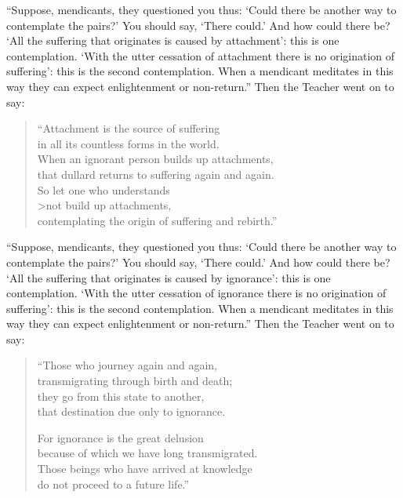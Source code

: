 \documentclass[12pt,openany]{book}%
\begin{document}
“Suppose, mendicants, they questioned you thus: ‘Could there be another way to contemplate the pairs?’ You should say, ‘There could.’ And how could there be? ‘All the suffering that originates is caused by attachment’: this is one contemplation. ‘With the utter cessation of attachment there is no origination of suffering’: this is the second contemplation. When a mendicant meditates in this way they can expect enlightenment or non-return.” Then the Teacher went on to say: 

\begin{verse}%
“Attachment is the source of suffering \\
in all its countless forms in the world. \\
When an ignorant person builds up attachments, \\
that dullard returns to suffering again and again. \\
So let one who understands \\>not build up attachments, \\
contemplating the origin of suffering and rebirth.” 

%
\end{verse}

“Suppose, mendicants, they questioned you thus: ‘Could there be another way to contemplate the pairs?’ You should say, ‘There could.’ And how could there be? ‘All the suffering that originates is caused by ignorance’: this is one contemplation. ‘With the utter cessation of ignorance there is no origination of suffering’: this is the second contemplation. When a mendicant meditates in this way they can expect enlightenment or non-return.” Then the Teacher went on to say: 

\begin{verse}%
“Those who journey again and again, \\
transmigrating through birth and death; \\
they go from this state to another, \\
that destination due only to ignorance. 

For ignorance is the great delusion \\
because of which we have long transmigrated. \\
Those beings who have arrived at knowledge \\
do not proceed to a future life.” 

%
\end{verse}
\end{document}
